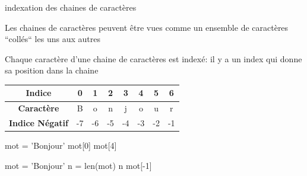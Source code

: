 \begin{easybox}{indexation des chaines de caractères}{}
    
    \begin{minipage}{0.5\linewidth}
 Les chaines de caractères peuvent être vues comme un ensemble de caractères ``collés`` les uns aux autres

    Chaque caractère d'une chaine de caractères est indexé: 
    il y a un index qui donne sa position dans la chaine       
    \end{minipage}
    \begin{minipage}{0.5\linewidth}
 \begin{center}
        \begin{tabular}{|c|c|c|c|c|c|c|c|}
        \hline
        \textbf{Indice} & 0 & 1 & 2 & 3 & 4 & 5 & 6 \\
        \hline
        \textbf{Caractère} & B & o & n & j & o & u & r \\
        \hline
        \textbf{Indice Négatif} & -7 & -6 & -5 & -4 & -3 & -2 & -1 \\
        \hline
        \end{tabular}
    \end{center}       
    \end{minipage}
    
   
    

    \begin{minipage}[t]{0.48\linewidth}
        \begin{ConsolePythontex}[TaillePolice=\large, Label=false]{}
            mot = 'Bonjour'
            mot[0]
            mot[4]
        \end{ConsolePythontex}
    \end{minipage}\hfill
    \begin{minipage}[t]{0.48\linewidth}
        \begin{ConsolePythontex}[TaillePolice=\large, Label=false]{}
mot = 'Bonjour'
n = len(mot)
n
mot[-1]
		\end{ConsolePythontex}
    \end{minipage}
   
\end{easybox}

